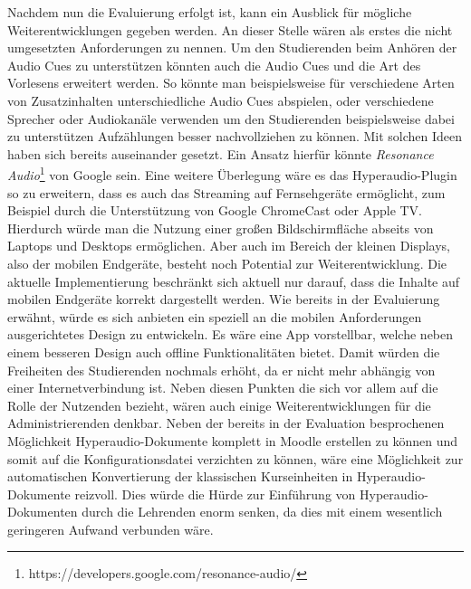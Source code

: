 Nachdem nun die Evaluierung erfolgt ist, kann ein Ausblick für mögliche Weiterentwicklungen gegeben werden. An dieser Stelle wären als erstes die nicht umgesetzten Anforderungen zu nennen. Um den Studierenden beim Anhören der Audio Cues zu unterstützen könnten auch die Audio Cues und die Art des Vorlesens erweitert werden. So könnte man beispielsweise für verschiedene Arten von Zusatzinhalten unterschiedliche Audio Cues abspielen, oder verschiedene Sprecher oder Audiokanäle verwenden um den Studierenden beispielsweise dabei zu unterstützen Aufzählungen besser nachvollziehen zu können. Mit solchen Ideen haben sich bereits \cite{donker2007gestaltung} auseinander gesetzt. Ein Ansatz hierfür könnte \textit{Resonance Audio}\footnote{https://developers.google.com/resonance-audio/} von Google sein.
Eine weitere Überlegung wäre es das Hyperaudio-Plugin so zu erweitern, dass es auch das Streaming auf Fernsehgeräte ermöglicht, zum Beispiel durch die Unterstützung von Google ChromeCast oder Apple TV. Hierdurch würde man die Nutzung einer großen Bildschirmfläche abseits von Laptops und Desktops ermöglichen.
Aber auch im Bereich der kleinen Displays, also der mobilen Endgeräte, besteht noch Potential zur Weiterentwicklung. Die aktuelle Implementierung beschränkt sich aktuell nur darauf, dass die Inhalte auf mobilen Endgeräte korrekt dargestellt werden. Wie bereits in der Evaluierung erwähnt, würde es sich anbieten ein speziell an die mobilen Anforderungen ausgerichtetes Design zu entwickeln. Es wäre eine App vorstellbar, welche neben einem besseren Design auch offline Funktionalitäten bietet. Damit würden die Freiheiten des Studierenden nochmals erhöht, da er nicht mehr abhängig von einer Internetverbindung ist.
Neben diesen Punkten die sich vor allem auf die Rolle der Nutzenden bezieht, wären auch einige Weiterentwicklungen für die Administrierenden denkbar. Neben der bereits in der Evaluation besprochenen Möglichkeit Hyperaudio-Dokumente komplett in Moodle erstellen zu können und somit auf die Konfigurationsdatei verzichten zu können, wäre eine Möglichkeit zur automatischen Konvertierung der klassischen Kurseinheiten in Hyperaudio-Dokumente reizvoll. Dies würde die Hürde zur Einführung von Hyperaudio-Dokumenten durch die Lehrenden enorm senken, da dies mit einem wesentlich geringeren Aufwand verbunden wäre.


